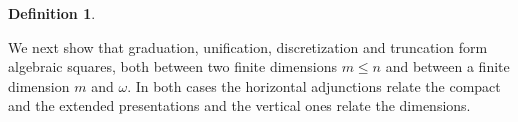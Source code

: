 \documentclass{amsart}
\theoremstyle{plain}
\theoremstyle{definition}
\newtheorem{definition}[theorem]{Definition}
\begin{document}
\begin{definition}
\begin{center}
\end{center}
\end{definition}

We next show that graduation, unification, discretization and truncation form algebraic squares, both between two finite dimensions $m\leq n$ and between a finite dimension $m$ and $\omega$. In both cases the horizontal adjunctions relate the compact and the extended presentations and the vertical ones relate the dimensions.
\end{document}
